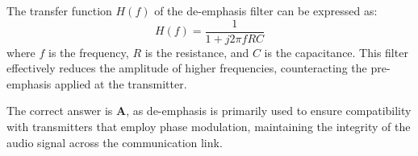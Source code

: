The transfer function \( H(f) \) of the de-emphasis filter can be expressed as:
\[
H(f) = \frac{1}{1 + j2\pi fRC}
\]
where \( f \) is the frequency, \( R \) is the resistance, and \( C \) is the capacitance. This filter effectively reduces the amplitude of higher frequencies, counteracting the pre-emphasis applied at the transmitter.

The correct answer is \textbf{A}, as de-emphasis is primarily used to ensure compatibility with transmitters that employ phase modulation, maintaining the integrity of the audio signal across the communication link.

